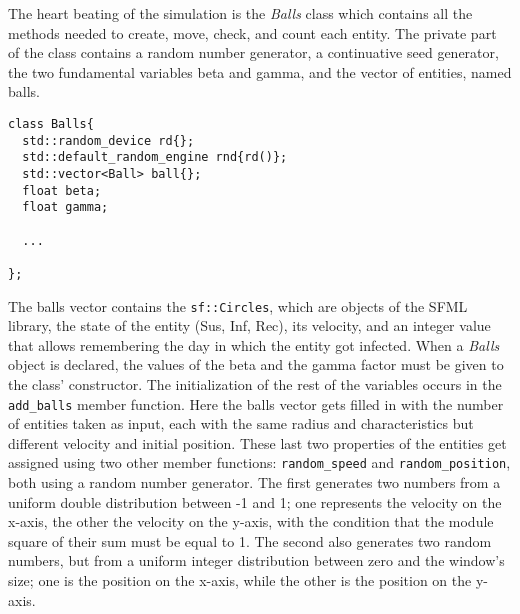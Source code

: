 The heart beating of the simulation is the \emph{Balls} class which contains all the methods needed to create, move, check, and count each entity. The private part of the class contains a random number generator, a continuative seed generator, the two fundamental variables beta and gamma, and the vector of entities, named balls.
  \begin{verbatim}
class Balls{
  std::random_device rd{};
  std::default_random_engine rnd{rd()};
  std::vector<Ball> ball{};
  float beta;
  float gamma;

  ...

};
\end{verbatim}

The balls vector contains the \verb|sf::Circles|, which are objects of the SFML library, the state of the entity (Sus, Inf, Rec), its velocity, and an integer value that allows remembering the day in which the entity got infected.
  When a \emph{Balls} object is declared, the values of the beta and the gamma factor must be given to the class' constructor. The initialization of the rest of the variables occurs in the \verb|add_balls| member function. Here the balls vector gets filled in with the number of entities taken as input, each with the same radius and characteristics but different velocity and initial position. These last two properties of the entities get assigned using two other member functions: \verb|random_speed| and \verb|random_position|, both using a random number generator. The first generates two numbers from a uniform double distribution between -1 and 1; one represents the velocity on the x-axis, the other the velocity on the y-axis, with the condition that the module square of their sum must be equal to 1. The second also generates two random numbers, but from a uniform integer distribution between zero and the window's size; one is the position on the x-axis, while the other is the position on the y-axis.

